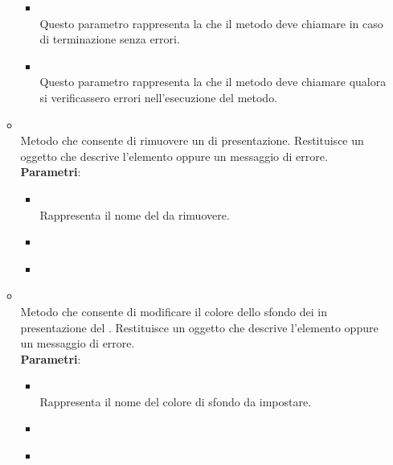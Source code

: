\begin{itemize}
\begin{itemize}
\begin{itemize}
\item {}
\\ Questo parametro rappresenta la  che il metodo deve chiamare in caso di terminazione senza errori.
\item {}
\\ Questo parametro rappresenta la  che il metodo deve chiamare qualora si verificassero errori nell'esecuzione del metodo.
\end{itemize}
\item {}
\\ Metodo che consente di rimuovere un  di presentazione. Restituisce un oggetto  che descrive l’elemento oppure un messaggio di errore.
\\ \textbf{Parametri}:
\begin{itemize}
\item {}
\\ Rappresenta il nome del  da rimuovere.
\item {}
\\ \dpCallback
\item {}
\\ \dpErrBack
\end{itemize}
\item {}
\\ Metodo che consente di modificare il colore dello sfondo dei  in presentazione del . Restituisce un oggetto  che descrive l’elemento oppure un messaggio di errore.
\\ \textbf{Parametri}:
\begin{itemize}
\item {}
\\ Rappresenta il nome del colore di sfondo da impostare.
\item {}
\\ \dpCallback
\item {}
\\ \dpErrBack
\end{itemize}

\end{itemize}
\end{itemize}
